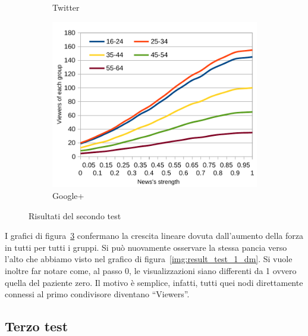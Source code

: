 \begin{figure}[!ht]
\begin{subfigure}[c]{0.32\textwidth}
\begin{center}
    \end{center}
    \vspace*{-10pt}
    \caption{Twitter}
    \label{img:result_test_2_tw_2}
  \end{subfigure}  
  \begin{subfigure}[r]{0.32\textwidth}
    \begin{center}
      \includegraphics[width=1\textwidth]{charts/second-test-gp_2.pdf}
    \end{center}
    \vspace*{-10pt}
    \caption{Google+}
    \label{img:result_test_2_gp_2}
  \end{subfigure}  
 \caption{Risultati del secondo test}
 \label{img:results_test_2_2}
\end{figure}
\vspace*{-15pt}

I grafici di figura~\ref{img:results_test_2_2} confermano la crescita lineare dovuta dall'aumento della forza in tutti per tutti i gruppi.
Si può nuovamente osservare la stessa pancia verso l'alto che abbiamo visto nel grafico di figura~\ref{img:result_test_1_dm}. 
Si vuole inoltre far notare come, al passo 0, le visualizzazioni siano differenti da 1 ovvero quella del paziente zero.
Il motivo è semplice, infatti, tutti quei nodi direttamente connessi al primo condivisore diventano ``Viewers''.

\subsection{Terzo test}
\label{section:third_test}


